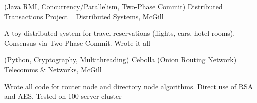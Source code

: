 \begin{cventries}

\cventry
  {(Java RMI, Concurrency/Parallelism, Two-Phase Commit)} %
  {\href{https://github.com/stumash/DistributedSystemsProject}{Distributed Transactions Project \ \faGithubSquare\acvHeaderIconSep}} %
  {Distributed Systems, McGill} %
  {} %
  { %
    \begin{cvitems}
    \item {A toy distributed system for travel reservations (flights, cars, hotel rooms). Consensus via Two-Phase Commit. Wrote it all}
    \end{cvitems}
  }


\cventry
  {(Python, Cryptography, Multithreading)} %
  {
    \href{https://github.com/CamiloGarciaLaRotta/Cebolla}{Cebolla (Onion Routing Network) \ \faGithubSquare\acvHeaderIconSep}
    \href{https://www.youtube.com/watch?v=jR9N_xxLs6A}{\color{darkred}{\faYoutubePlay}}
  } %
  {Telecomms \& Networks, McGill} %
  {} %
  { %
    \begin{cvitems}
    \item {Wrote all code for router node and directory node algorithms. Direct use of RSA and AES. Tested on 100-server cluster}
    \end{cvitems}
  }


\end{cventries}
